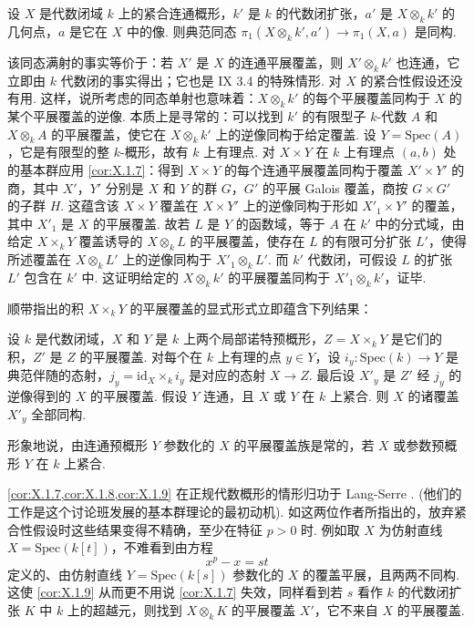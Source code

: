 \begin{corollary}\label{cor:X.1.8}
设 $X$ 是代数闭域 $k$ 上的紧合连通概形，$k'$ 是 $k$ 的代数闭扩张，$a'$ 是 $X \otimes_k k'$ 的几何点，$a$ 是它在 $X$ 中的像. 则典范同态 $\pi_1(X \otimes_k k', a') \to \pi_1(X, a)$ 是同构.
\end{corollary}

该同态满射的事实等价于：若 $X'$ 是 $X$ 的连通平展覆盖，则 $X' \otimes_k k'$ 也连通，它立即由 $k$ 代数闭的事实得出；它也是 IX 3.4 的特殊情形. 对 $X$ 的紧合性假设还没有用. 这样，说所考虑的同态单射也意味着：$X \otimes_k k'$ 的每个平展覆盖同构于 $X$ 的某个平展覆盖的逆像. 本质上是寻常的：可以找到 $k'$ 的有限型子 $k$-代数 $A$ 和 $X \otimes_k A$ 的平展覆盖，使它在 $X \otimes_k k'$ 上的逆像同构于给定覆盖. 设 $Y = \mathrm{Spec}(A)$，它是有限型的整 $k$-概形，故有 $k$ 上有理点. 对 $X \times Y$ 在 $k$ 上有理点 $(a, b)$ 处的基本群应用 \ref{cor:X.1.7}：得到 $X \times Y$ 的每个连通平展覆盖同构于覆盖 $X' \times Y'$ 的商，其中 $X'$，$Y'$ 分别是 $X$ 和 $Y$ 的群 $G$，$G'$ 的平展 Galois 覆盖，商按 $G \times G'$ 的子群 $H$. 这蕴含该 $X \times Y$ 覆盖在 $X \times Y'$ 上的逆像同构于形如 $X'_1 \times Y'$ 的覆盖，其中 $X'_1$ 是 $X$ 的平展覆盖. 故若 $L$ 是 $Y$ 的函数域，等于 $A$ 在 $k'$ 中的分式域，由给定 $X \times_k Y$ 覆盖诱导的 $X \otimes_k L$ 的平展覆盖，使存在 $L$ 的有限可分扩张 $L'$，使得所述覆盖在 $X \otimes_k L'$ 上的逆像同构于 $X'_1 \otimes_k L'$. 而 $k'$ 代数闭，可假设 $L$ 的扩张 $L'$ 包含在 $k'$ 中. 这证明给定的 $X \otimes_k k'$ 的平展覆盖同构于 $X'_1 \otimes_k k'$，证毕.

顺带指出的积 $X \times_k Y$ 的平展覆盖的显式形式立即蕴含下列结果：

\begin{corollary}\label{cor:X.1.9}
设 $k$ 是代数闭域，$X$ 和 $Y$ 是 $k$ 上两个局部诺特预概形，$Z = X \times_k Y$ 是它们的积，$Z'$ 是 $Z$ 的平展覆盖. 对每个在 $k$ 上有理的点 $y \in Y$，设 $i_y \colon \mathrm{Spec}(k) \to Y$ 是典范伴随的态射，$j_y = \mathrm{id}_X \times_k i_y$ 是对应的态射 $X \to Z$. 最后设 $X'_y$ 是 $Z'$ 经 $j_y$ 的逆像得到的 $X$ 的平展覆盖. 假设 $Y$ 连通，且 $X$ 或 $Y$ 在 $k$ 上紧合. 则 $X$ 的诸覆盖 $X'_y$ 全部同构.
\end{corollary}

形象地说，由连通预概形 $Y$ 参数化的 $X$ 的平展覆盖族是常的，若 $X$ 或参数预概形 $Y$ 在 $k$ 上紧合.

\begin{remark}\label{rem:X.1.10}
\cref{cor:X.1.7,cor:X.1.8,cor:X.1.9} 在正规代数概形的情形归功于 Lang-Serre \cite{exp10-2}. (他们的工作是这个讨论班发展的基本群理论的最初动机). 如这两位作者所指出的，放弃紧合性假设时这些结果变得不精确，至少在特征 $p > 0$ 时. 例如取 $X$ 为仿射直线 $X = \mathrm{Spec}(k[t])$，不难看到由方程
\[
x^p - x = st
\]
定义的、由仿射直线 $Y = \mathrm{Spec}(k[s])$ 参数化的 $X$ 的覆盖平展，且两两不同构. 这使 \ref{cor:X.1.9} 从而更不用说 \ref{cor:X.1.7} 失效，同样看到若 $s$ 看作 $k$ 的代数闭扩张 $K$ 中 $k$ 上的超越元，则找到 $X \otimes_k K$ 的平展覆盖 $X'$，它不来自 $X$ 的平展覆盖.
\end{remark}

